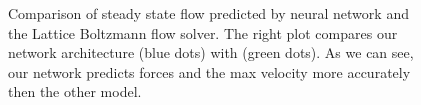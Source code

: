 \documentclass{article} %
\begin{document}
\begin{figure}[h]
\begin{center}
\end{center}
\caption{Comparison of steady state flow predicted by neural network and the Lattice Boltzmann flow solver. The right plot compares our network architecture (blue dots) with \citet{guo2016convolutional} (green dots). As we can see, our network predicts forces and the max velocity more accurately then the other model. }
\label{flow_accuracy}
\end{figure}
\end{document}
